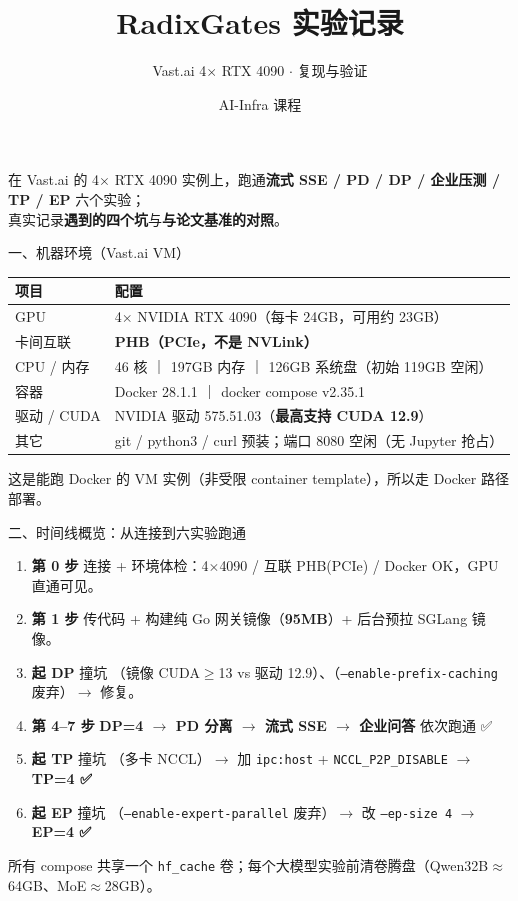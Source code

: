 \documentclass[aspectratio=169,11pt]{beamer}
\title[RadixGates 实验记录]{RadixGates 实验记录}
\subtitle{Vast.ai 4$\times$ RTX 4090 $\cdot$ 复现与验证}
\author{AI-Infra 课程}
\date{}
\newcommand{\gc}[1]{\texttt{\small #1}}   %
\newcommand{\cnum}[1]{\tikz[baseline=(c.base)]{\node[draw,circle,inner sep=1.2pt,line width=0.5pt](c){\scriptsize #1};}}
\begin{document}
\begin{frame}
  \titlepage
  \vspace{-1em}
  \small\centering
  在 Vast.ai 的 4$\times$ RTX 4090 实例上，跑通\textbf{流式 SSE / PD / DP / 企业压测 / TP / EP} 六个实验；\\
  真实记录\textbf{遇到的四个坑}与\textbf{与论文基准的对照}。
\end{frame}

\begin{frame}{一、机器环境（Vast.ai VM）}
\small
\begin{tabular}{@{}p{3.6cm}p{9.0cm}@{}}
\toprule
\textbf{项目} & \textbf{配置} \\
\midrule
GPU        & 4$\times$ NVIDIA RTX 4090（每卡 24GB，可用约 23GB） \\
\addlinespace
卡间互联   & \textbf{PHB（PCIe，不是 NVLink）} \\
\addlinespace
CPU / 内存 & 46 核 ｜ 197GB 内存 ｜ 126GB 系统盘（初始 119GB 空闲） \\
\addlinespace
容器       & Docker 28.1.1 ｜ docker compose v2.35.1 \\
\addlinespace
驱动 / CUDA & NVIDIA 驱动 575.51.03（\textbf{最高支持 CUDA 12.9}） \\
\addlinespace
其它       & git / python3 / curl 预装；端口 8080 空闲（无 Jupyter 抢占） \\
\bottomrule
\end{tabular}
\vfill
\centering\scriptsize
这是能跑 Docker 的 VM 实例（非受限 container template），所以走 Docker 路径部署。
\end{frame}

\begin{frame}{二、时间线概览：从连接到六实验跑通}
\small
\begin{enumerate}
  \item \textbf{第 0 步} 连接 + 环境体检：4$\times$4090 / 互联 PHB(PCIe) / Docker OK，GPU 直通可见。
  \item \textbf{第 1 步} 传代码 + 构建纯 Go 网关镜像（\textbf{95MB}）+ 后台预拉 SGLang 镜像。
  \item \textbf{起 DP} 撞坑 \cnum{1}（镜像 CUDA$\geq$13 vs 驱动 12.9）、\cnum{2}（\gc{--enable-prefix-caching} 废弃）$\to$ 修复。
  \item \textbf{第 4–7 步} \textcolor{rggreen}{\textbf{DP=4 $\to$ PD 分离 $\to$ 流式 SSE $\to$ 企业问答}} 依次跑通 ✅
  \item \textbf{起 TP} 撞坑 \cnum{3}（多卡 NCCL）$\to$ 加 \gc{ipc:host} + \gc{NCCL\_P2P\_DISABLE} $\to$ \textcolor{rggreen}{\textbf{TP=4 ✅}}
  \item \textbf{起 EP} 撞坑 \cnum{4}（\gc{--enable-expert-parallel} 废弃）$\to$ 改 \gc{--ep-size 4} $\to$ \textcolor{rggreen}{\textbf{EP=4 ✅}}
\end{enumerate}
\vfill
\centering\scriptsize 所有 compose 共享一个 \gc{hf\_cache} 卷；每个大模型实验前清卷腾盘（Qwen32B$\approx$64GB、MoE$\approx$28GB）。
\end{frame}
\end{document}
